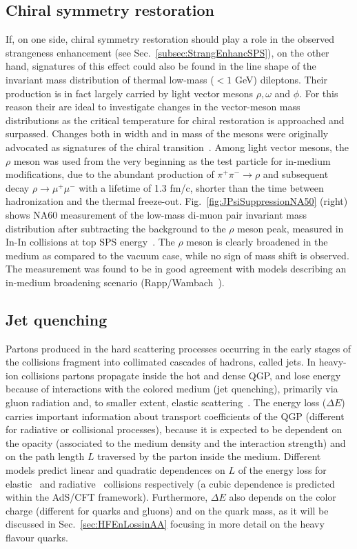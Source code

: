 \subsection{Chiral symmetry restoration}
If, on one side, chiral symmetry restoration should play a role in the 
observed strangeness enhancement (see Sec.~\ref{subsec:StrangEnhancSPS}),
on the other hand, signatures of this effect could also be found in the line shape of the
invariant mass distribution of thermal low-mass ($< 1$ GeV) dileptons.
Their production is in fact largely carried by light 
vector mesons $\rho, \omega$ and $\phi$. For this reason their are ideal to investigate
changes in the vector-meson mass distributions as the critical temperature for chiral
restoration is approached and surpassed. Changes both in width and in mass of
the mesons were originally advocated as signatures of the chiral transition~\cite{Pisarski:1981mq}. 
Among light vector mesons, the $\rho$ meson was used from the very beginning as the test particle for in-medium 
modifications, due to the abundant production
of $\pi^+ \pi^- \rightarrow \rho$ and subsequent decay $\rho \rightarrow \mu^+ \mu^- $ 
with a lifetime of 1.3 fm/c, shorter than the time between hadronization and the thermal freeze-out. 
Fig.~\ref{fig:JPsiSuppressionNA50} (right) shows NA60 measurement of the 
low-mass di-muon pair invariant mass distribution after 
subtracting the background to the $\rho$ meson peak, 
measured in In-In collisions at top SPS energy~\cite{Damjanovic:2005ni}. The $\rho$ meson is
clearly broadened in the medium as compared to the vacuum case, 
while no sign of mass shift is observed. The measurement
was found to be in good agreement with models describing an in-medium broadening 
scenario (Rapp/Wambach~\cite{Rapp:2012zq}).

\subsection{Jet quenching}
\label{sec:JetQuenching}
Partons produced in the hard scattering processes occurring in the early stages of the 
collisions fragment into collimated cascades of hadrons, called jets. 
In heavy-ion collisions partons propagate inside the hot and dense QGP,
 and lose energy because of interactions with the colored medium 
 (jet quenching), primarily via gluon radiation and, to smaller extent, 
 elastic scattering~\cite{Qin:2015srf}. The energy loss ($\Delta E$) carries 
 important information about transport coefficients 
 of the QGP (different for radiative or collisional processes), because it
  is expected to be dependent on the opacity 
 (associated to the medium density and the interaction strength) 
 and on the path length $L$ traversed by the parton inside the medium.
  Different models predict linear and quadratic dependences on $L$ 
  of the energy loss for elastic~\cite{Thoma:1990fm} and radiative~\cite{Baier:1996sk} 
  collisions respectively (a cubic dependence is predicted within the 
  AdS/CFT framework). Furthermore, $\Delta E$ also depends on the 
  color charge (different for quarks and gluons) and on the quark mass, 
  as it will be discussed in Sec.~\ref{sec:HFEnLossinAA} focusing in more detail on the heavy flavour quarks.

